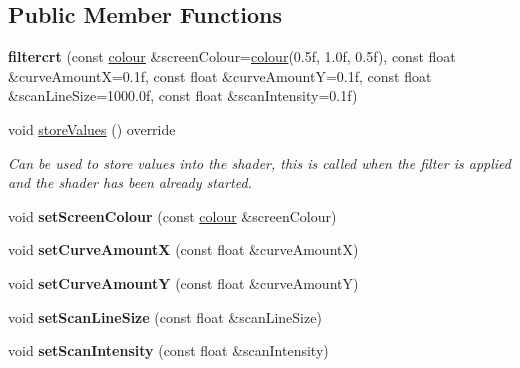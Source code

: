 \subsection*{Public Member Functions}
\begin{DoxyCompactItemize}
\item 
\mbox{\label{classflounder_1_1filtercrt_a892c31fec4aefa3ffde3e78ad3acb9f0}} 
{\bfseries filtercrt} (const \hyperlink{classflounder_1_1colour}{colour} \&screen\+Colour=\hyperlink{classflounder_1_1colour}{colour}(0.\+5f, 1.\+0f, 0.\+5f), const float \&curve\+Amount\+X=0.\+1f, const float \&curve\+Amount\+Y=0.\+1f, const float \&scan\+Line\+Size=1000.\+0f, const float \&scan\+Intensity=0.\+1f)
\item 
void \hyperlink{classflounder_1_1filtercrt_a6b3d151d6e338a7c859aeea1016724dc}{store\+Values} () override
\begin{DoxyCompactList}\small\item\em Can be used to store values into the shader, this is called when the filter is applied and the shader has been already started. \end{DoxyCompactList}\item 
\mbox{\label{classflounder_1_1filtercrt_ac156aff36d490b409b1911f2893bd95f}} 
void {\bfseries set\+Screen\+Colour} (const \hyperlink{classflounder_1_1colour}{colour} \&screen\+Colour)
\item 
\mbox{\label{classflounder_1_1filtercrt_a74e9525a871edaeb291a3470b5c58dd3}} 
void {\bfseries set\+Curve\+AmountX} (const float \&curve\+AmountX)
\item 
\mbox{\label{classflounder_1_1filtercrt_af240aa2427e6b14021fa60780788822f}} 
void {\bfseries set\+Curve\+AmountY} (const float \&curve\+AmountY)
\item 
\mbox{\label{classflounder_1_1filtercrt_af05d18c6418e6adfe6a798f3f86d171a}} 
void {\bfseries set\+Scan\+Line\+Size} (const float \&scan\+Line\+Size)
\item 
\mbox{\label{classflounder_1_1filtercrt_ac4b470e46a16c4625ade473ac00ac758}} 
void {\bfseries set\+Scan\+Intensity} (const float \&scan\+Intensity)
\end{DoxyCompactItemize}
